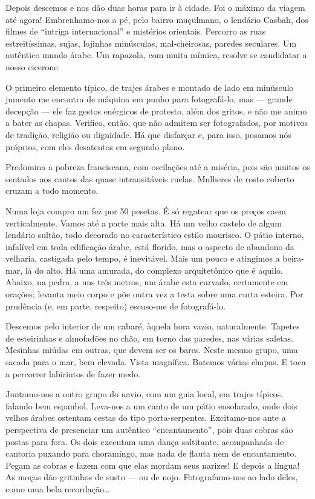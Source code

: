 Depois descemos e nos dão duas horas para ir à cidade. Foi o máximo da viagem até agora! Embrenhamo-nos a pé, pelo bairro muçulmano, o lendário Casbah, dos filmes de ``intriga internacional'' e mistérios orientais. Percorro as ruas estreitíssimas, sujas, lojinhas minúsculas, mal-cheirosas, paredes seculares. Um autêntico mundo árabe. Um rapazola, com muita mímica, resolve se candidatar a nosso cicerone.

O primeiro elemento típico, de trajes árabes e montado de lado em minúsculo jumento me encontra de máquina em punho para fotografá-lo, mas --- grande decepção --- ele faz gestos enérgicos de protesto, além dos gritos, e não me animo a bater as chapas. Verifico, então, que não admitem ser fotografados, por motivos de tradição, religião ou dignidade. Há que disfarçar e, para isso, posamos nós próprios, com eles desatentos em segundo plano.

Predomina a pobreza franciscana, com oscilações até a miséria, pois são muitos os sentados aos cantos das quase intransitáveis ruelas. Mulheres de rosto coberto cruzam a todo momento.

Numa loja compro um fez por 50 pesetas. É só regatear que os preços caem verticalmente. Vamos até a parte mais alta. Há um velho castelo de algum lendário sultão, todo decorado no característico estilo mourisco. O pátio interno, infalível em toda edificação árabe, está florido, mas o aspecto de abandono da velharia, castigada pelo tempo, é inevitável. Mais um pouco e atingimos a beira-mar, lá do alto. Há uma amurada, do complexo arquitetônico que é aquilo. Abaixo, na pedra, a uns três metros, um árabe esta curvado, certamente em orações; levanta meio corpo e põe outra vez a testa sobre uma curta esteira. Por prudência (e, em parte, respeito) escuso-me de fotografá-lo.

Descemos pelo interior de um cabaré, àquela hora vazio, naturalmente. Tapetes de esteirinhas e almofadões no chão, em torno das paredes, nas várias saletas. Mesinhas miúdas em outras, que devem ser os bares. Neste mesmo grupo, uma sacada para o mar, bem elevada. Vista magnífica. Batemos várias chapas. E toca a percorrer labirintos de fazer medo.

Juntamo-nos a outro grupo do navio, com um guia local, em trajes típicos, falando bem espanhol. Leva-nos a um canto de um pátio ensolarado, onde dois velhos árabes ostentam cestas do tipo porta-serpentes. Excitamo-nos ante a perspectiva de presenciar um autêntico ``encantamento'', pois duas cobras são postas para fora. Os dois executam uma dança saltitante, acompanhada de cantoria puxando para choramingo, mas nada de flauta nem de encantamento. Pegam as cobras e fazem com que elas mordam seus narizes! E depois a língua! As moças dão gritinhos de susto --- ou de nojo. Fotografamo-nos ao lado deles, como uma bela recordação\ldots

